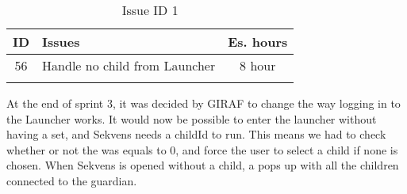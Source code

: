 \begin{longtable} { | c | p{12cm} | c | } 
\hline
	ID 	&	Issues	&		 Es. hours \\\hline
	56	&	Handle no child from Launcher	&	8 hour	\\\hline
\caption{Issue ID 1}
\label{tab:spr4_iconstobuttons}
\end{longtable}

At the end of sprint 3, it was decided by GIRAF to change the way logging in to the Launcher works. It would now be possible to enter the launcher without having a  set, and Sekvens needs a childId to run. This means we had to check whether or not the  was equals to 0, and force the user to select a child if none is chosen. When Sekvens is opened without a child, a  pops up with all the children connected to the guardian.